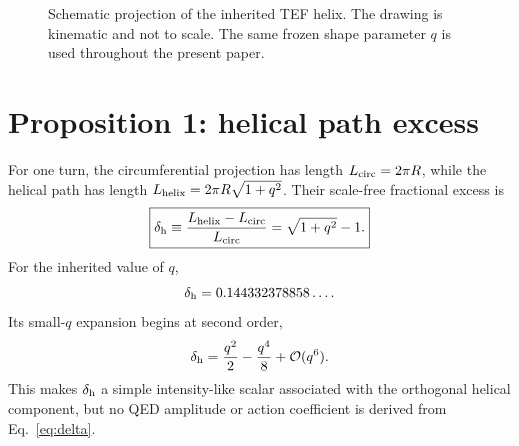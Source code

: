 \documentclass[10pt,twocolumn]{article}
\begin{document}
\begin{figure}[t]
\centering
{}
\caption{Schematic projection of the inherited TEF helix.  The drawing is kinematic and
not to scale.  The same frozen shape parameter $q$ is used throughout the present paper.}
\label{fig:helix}
\end{figure}

\section{Proposition 1: helical path excess}

For one turn, the circumferential projection has length $L_{\rm circ}=2\pi R$, while the
helical path has length $L_{\rm helix}=2\pi R\sqrt{1+q^2}$.  Their scale-free fractional excess is
\begin{equation}
\boxed{
\delta_{\rm h}\equiv
\frac{L_{\rm helix}-L_{\rm circ}}{L_{\rm circ}}
=\sqrt{1+q^2}-1.
}
\label{eq:delta}
\end{equation}
For the inherited value of $q$,
\begin{equation}
\delta_{\rm h}=0.144332378858\ldots.
\end{equation}
Its small-$q$ expansion begins at second order,
\begin{equation}
\delta_{\rm h}
=\frac{q^2}{2}-\frac{q^4}{8}+\mathcal O(q^6).
\label{eq:smallq}
\end{equation}
This makes $\delta_{\rm h}$ a simple intensity-like scalar associated with the orthogonal helical
component, but no QED amplitude or action coefficient is derived from Eq.~\eqref{eq:delta}.
\end{document}
